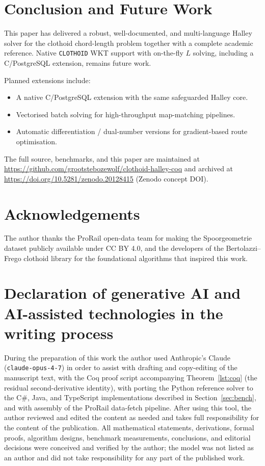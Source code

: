 \documentclass[11pt,a4paper]{article}
\begin{document}
\section{Conclusion and Future Work}
\label{sec:conclusion}

This paper has delivered a robust, well-documented, and multi-language Halley solver for the clothoid chord-length problem together with a complete academic reference. Native \texttt{CLOTHOID} WKT support with on-the-fly $L$ solving, including a C/PostgreSQL extension, remains future work.

Planned extensions include:
\begin{itemize}
    \item A native C/PostgreSQL extension with the same safeguarded Halley core.
    \item Vectorised batch solving for high-throughput map-matching pipelines.
    \item Automatic differentiation / dual-number versions for gradient-based route optimisation.
\end{itemize}

The full source, benchmarks, and this paper are maintained at \url{https://github.com/grootstebozewolf/clothoid-halley-coq} and archived at \url{https://doi.org/10.5281/zenodo.20128415} (Zenodo concept DOI).

\section*{Acknowledgements}
The author thanks the ProRail open-data team for making the Spoorgeometrie dataset publicly available under CC BY 4.0, and the developers of the Bertolazzi--Frego clothoid library for the foundational algorithms that inspired this work.

\section*{Declaration of generative AI and AI-assisted technologies in the writing process}
During the preparation of this work the author used Anthropic's Claude (\texttt{claude-opus-4-7}) in order to assist with drafting and copy-editing of the manuscript text, with the Coq proof script accompanying Theorem~\ref{lst:coq} (the residual second-derivative identity), with porting the Python reference solver to the C\#, Java, and TypeScript implementations described in Section~\ref{sec:bench}, and with assembly of the ProRail data-fetch pipeline. After using this tool, the author reviewed and edited the content as needed and takes full responsibility for the content of the publication. All mathematical statements, derivations, formal proofs, algorithm designs, benchmark measurements, conclusions, and editorial decisions were conceived and verified by the author; the model was not listed as an author and did not take responsibility for any part of the published work.



\end{document}
